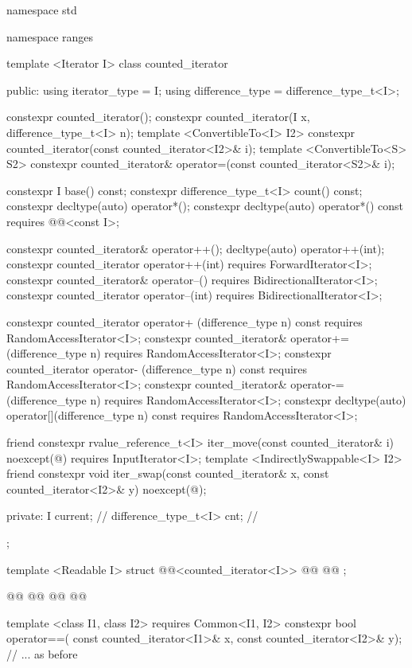 %
\begin{codeblock}
namespace std { namespace ranges {
  template <Iterator I>
  class counted_iterator {
  public:
    using iterator_type = I;
    using difference_type = difference_type_t<I>;

    constexpr counted_iterator();
    constexpr counted_iterator(I x, difference_type_t<I> n);
    template <ConvertibleTo<I> I2>
      constexpr counted_iterator(const counted_iterator<I2>& i);
    template <ConvertibleTo<S> S2>
      constexpr counted_iterator& operator=(const counted_iterator<S2>& i);

    constexpr I base() const;
    constexpr difference_type_t<I> count() const;
    constexpr decltype(auto) operator*();
    constexpr decltype(auto) operator*() const
      requires @@<const I>;

    constexpr counted_iterator& operator++();
    decltype(auto) operator++(int);
    constexpr counted_iterator operator++(int)
      requires ForwardIterator<I>;
    constexpr counted_iterator& operator--()
      requires BidirectionalIterator<I>;
    constexpr counted_iterator operator--(int)
      requires BidirectionalIterator<I>;

    constexpr counted_iterator  operator+ (difference_type n) const
      requires RandomAccessIterator<I>;
    constexpr counted_iterator& operator+=(difference_type n)
      requires RandomAccessIterator<I>;
    constexpr counted_iterator  operator- (difference_type n) const
      requires RandomAccessIterator<I>;
    constexpr counted_iterator& operator-=(difference_type n)
      requires RandomAccessIterator<I>;
    constexpr decltype(auto) operator[](difference_type n) const
      requires RandomAccessIterator<I>;

    friend constexpr rvalue_reference_t<I> iter_move(const counted_iterator& i)
      noexcept(@\seebelow@)
        requires InputIterator<I>;
    template <IndirectlySwappable<I> I2>
      friend constexpr void iter_swap(const counted_iterator& x, const counted_iterator<I2>& y)
        noexcept(@\seebelow@);

  private:
    I current; // \expos
    difference_type_t<I> cnt; // \expos
  };

  template <Readable I>
  struct @@<counted_iterator<I>> {
    @@
    @@
  };

  @@
  @@
    @@
  @\removed{\};}@

  template <class I1, class I2>
      requires Common<I1, I2>
    constexpr bool operator==(
      const counted_iterator<I1>& x, const counted_iterator<I2>& y);
  // ... as before
}}
\end{codeblock}
